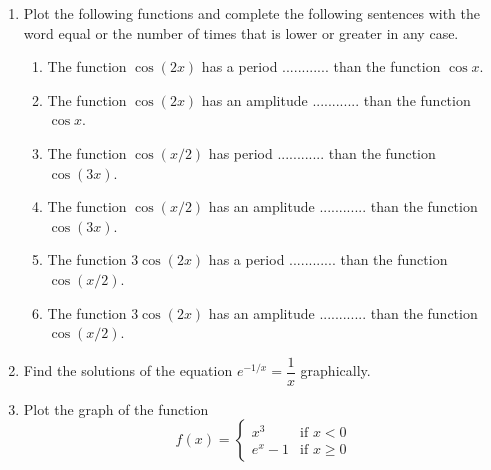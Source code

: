 \begin{enumerate}[leftmargin=*]
\item Plot the following functions and complete the following sentences with the word equal or the number of times that is lower or greater in any case.
\begin{enumerate}
\item The function $\cos(2x)$ has a period ............ than the function $\cos{x}$.
\item The function $\cos(2x)$ has an amplitude ............ than the function $\cos{x}$.
\item The function $\cos(x/2)$ has period ............ than the function $\cos(3x)$.
\item The function $\cos(x/2)$ has an amplitude ............ than the function $\cos(3x)$.
\item The function $3\cos(2x)$ has a period ............ than the function $\cos(x/2)$.
\item The function $3\cos(2x)$ has an amplitude ............ than the function $\cos(x/2)$.
\end{enumerate}

\item Find the solutions of the equation $e^{-1/x}=\dfrac{1}{x}$  graphically.

\item Plot the graph of the function
\[
f(x)=
\begin{cases}
x^3 & \mbox{if $x<0$} \\
e^x-1 & \mbox{if $x\geq0$}
\end{cases}
\]
\end{enumerate}
